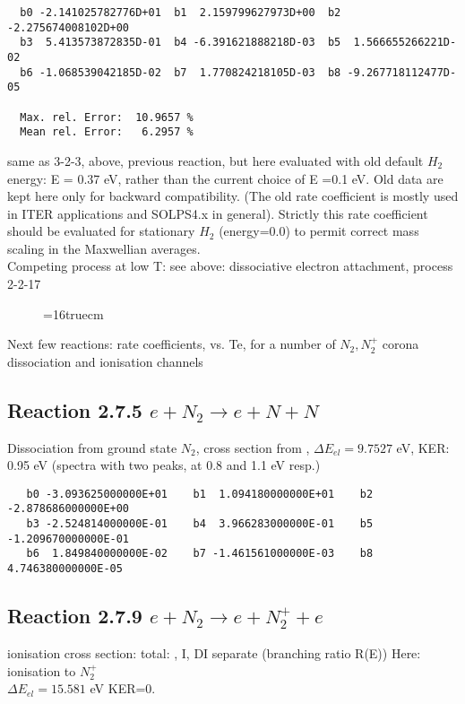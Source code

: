 \documentclass[12pt,dvipdfmx]{article}
\begin{document}
\begin{small}\begin{verbatim}
  b0 -2.141025782776D+01  b1  2.159799627973D+00  b2 -2.275674008102D+00
  b3  5.413573872835D-01  b4 -6.391621888218D-03  b5  1.566655266221D-02
  b6 -1.068539042185D-02  b7  1.770824218105D-03  b8 -9.267718112477D-05

  Max. rel. Error:  10.9657 %
  Mean rel. Error:   6.2957 %
\end{verbatim}
\end{small}
same as 3-2-3, above, previous reaction, but here evaluated with old default $H_2$ energy: E = 0.37 eV, rather than
the current choice of E =0.1 eV.
Old data are kept here only for backward compatibility.
(The old rate coefficient is mostly used in ITER applications
and SOLPS4.x in general).
Strictly this rate coefficient should be evaluated for stationary $H_2$  (energy=0.0) to permit
correct mass scaling in the Maxwellian averages.
\\
Competing process at low T: see above: dissociative electron attachment, process 2-2-17

\begin{figure} \label{3.2.3o}
\epsfxsize=16truecm
\end{figure}
\newpage


Next few reactions:  rate coefficients, vs. Te, for a number of $N_2, N_2^+$ corona dissociation and ionisation channels
\subsection{
Reaction 2.7.5  $e + N_2 \rightarrow e + N + N$ }
Dissociation from ground state $N_2$, cross section from \cite{kn:Cosby},
$\Delta E_{el} = 9.7527 $ eV, KER: 0.95 eV  (spectra with two peaks, at 0.8 and 1.1 eV resp.)


\begin{small}\begin{verbatim}
   b0 -3.093625000000E+01    b1  1.094180000000E+01    b2 -2.878686000000E+00
   b3 -2.524814000000E-01    b4  3.966283000000E-01    b5 -1.209670000000E-01
   b6  1.849840000000E-02    b7 -1.461561000000E-03    b8  4.746380000000E-05
\end{verbatim}\end{small}


\subsection{
Reaction 2.7.9  $e + N_2 \rightarrow e + N_2^+ + e$ }
ionisation cross section: total: \cite{kn:Rapp1}, I, DI separate \cite{kn:Rapp2} (branching ratio R(E))
Here: ionisation to $N_2^+$ \\
$\Delta E_{el} = 15.581 $ eV KER=0.
\end{document}
